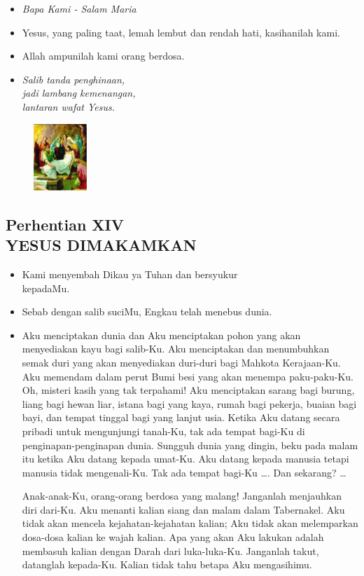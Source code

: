 \documentclass[a5paper,headsepline,titlepage,10pt,nnormalheadings,DIVcalc]{scrbook}
\newcommand{\BU}[1]{\begin{itemize} \item[U:] #1 \end{itemize}}
\newcommand{\BP}[1]{\begin{itemize} \item[P:] #1 \end{itemize}}
\newcommand{\kamiMenyembah}{\BP{ Kami menyembah Dikau ya Tuhan dan bersyukur\\kepadaMu.}
\BU{ Sebab dengan salib suciMu, Engkau telah menebus dunia.}
}
\newcommand{\kasihanilahKami}{\BP{Yesus, yang paling taat, lemah lembut dan rendah hati, kasihanilah kami.}
\BU{Allah ampunilah kami orang berdosa.}}
\begin{document}
\large\begin{itemize}\item[~]\it{Bapa Kami - Salam Maria}\end{itemize}\normalsize
\kasihanilahKami

\begin{itemize}
\item[14.] \it{Salib tanda penghinaan,\\
	jadi lambang kemenangan,\\
	lantaran wafat Yesus.}
\end{itemize}

\begin{figure}
\includegraphics[width=2cm]{jalansalib_files/14_small.jpg}
\end{figure}
\subsection*{Perhentian XIV\\
YESUS DIMAKAMKAN}

\kamiMenyembah

\BP{Aku menciptakan dunia dan Aku menciptakan pohon yang akan menyediakan kayu bagi salib-Ku. Aku menciptakan dan menumbuhkan semak duri yang akan menyediakan duri-duri bagi Mahkota Kerajaan-Ku. Aku memendam dalam perut Bumi besi yang akan menempa paku-paku-Ku. Oh, misteri kasih yang tak terpahami! Aku menciptakan sarang bagi burung, liang bagi hewan liar, istana bagi yang kaya, rumah bagi pekerja, buaian bagi bayi, dan tempat tinggal bagi yang lanjut usia. Ketika Aku datang secara pribadi untuk mengunjungi tanah-Ku, tak ada tempat bagi-Ku di penginapan-penginapan dunia. Sungguh dunia yang dingin, beku pada malam itu ketika Aku datang kepada umat-Ku. Aku datang kepada manusia tetapi manusia tidak mengenali-Ku. Tak ada tempat bagi-Ku \dots . Dan sekarang?  \dots 

Anak-anak-Ku, orang-orang berdosa yang malang! Janganlah menjauhkan diri dari-Ku. Aku menanti kalian siang dan malam dalam Tabernakel. Aku tidak akan mencela kejahatan-kejahatan kalian; Aku tidak akan melemparkan dosa-dosa kalian ke wajah kalian. Apa yang akan Aku lakukan adalah membasuh kalian dengan Darah dari luka-luka-Ku. Janganlah takut, datanglah kepada-Ku. Kalian tidak tahu betapa Aku mengasihimu.}
\end{document}
